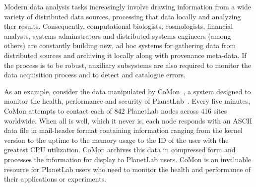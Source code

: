 
Modern data analysis tasks increasingly involve drawing information from
a wide variety of distributed data sources, processing that data locally
and analyzing ther results.  Consequently,
computational biologists, cosmologists, financial analysts, systems
adminstrators and distributed systems engineers (among others) are constantly building
new, ad hoc systems for gathering data from distributed sources and
archiving it locally along with provenance meta-data.  If the process
is to be robust, auxiliary subsystems are also required to monitor the
data acquisition process and to detect and catalogue errors.

As an example, consider the data
manipulated by CoMon~\cite{comon}, a system designed to monitor the
health, performance and security of PlanetLab~\cite{planetlab}.  Every
five minutes, CoMon attempts to contact each of 842 PlanetLab nodes
across 416 sites worldwide.%
% 
When all is well, which it never is, each node responds with
an ASCII data file in mail-header format containing information
ranging from the kernel version to the uptime to the memory usage to
the ID of the user with the greatest CPU utilization.  CoMon archives
this data in compressed form and processes the information
for display to PlanetLab users.  CoMon is an invaluable resource for
PlanetLab users who need to monitor the health and performance of their
applications or experiments.


